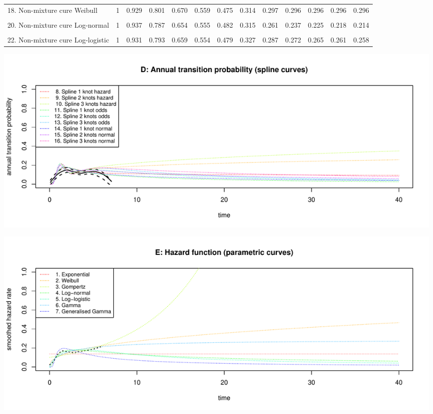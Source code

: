 \documentclass[]{article}
\begin{document}
\begin{table}
{\begin{tabular}[t]{lrrrrrrrrrrrr}
18. Non-mixture cure Weibull & 1 & 0.929 & 0.801 & 0.670 & 0.559 & 0.475 & 0.314 & 0.297 & 0.296 & 0.296 & 0.296 & 0.296\\
\cellcolor{gray!6}{19. Mixture cure Log-normal} & \cellcolor{gray!6}{1} & \cellcolor{gray!6}{0.936} & \cellcolor{gray!6}{0.790} & \cellcolor{gray!6}{0.658} & \cellcolor{gray!6}{0.556} & \cellcolor{gray!6}{0.479} & \cellcolor{gray!6}{0.295} & \cellcolor{gray!6}{0.238} & \cellcolor{gray!6}{0.215} & \cellcolor{gray!6}{0.205} & \cellcolor{gray!6}{0.200} & \cellcolor{gray!6}{0.197}\\
20. Non-mixture cure Log-normal & 1 & 0.937 & 0.787 & 0.654 & 0.555 & 0.482 & 0.315 & 0.261 & 0.237 & 0.225 & 0.218 & 0.214\\
\cellcolor{gray!6}{21. Mixture cure Log-logistic} & \cellcolor{gray!6}{1} & \cellcolor{gray!6}{0.931} & \cellcolor{gray!6}{0.793} & \cellcolor{gray!6}{0.658} & \cellcolor{gray!6}{0.553} & \cellcolor{gray!6}{0.477} & \cellcolor{gray!6}{0.318} & \cellcolor{gray!6}{0.275} & \cellcolor{gray!6}{0.259} & \cellcolor{gray!6}{0.250} & \cellcolor{gray!6}{0.246} & \cellcolor{gray!6}{0.243}\\
22. Non-mixture cure Log-logistic & 1 & 0.931 & 0.793 & 0.659 & 0.554 & 0.479 & 0.327 & 0.287 & 0.272 & 0.265 & 0.261 & 0.258\\
\bottomrule
\end{tabular}}
\end{table}

\begin{flushleft}\includegraphics[height=0.29\textheight]{Images/validate_extrapolation2-4} \end{flushleft}

\begin{flushleft}\includegraphics[height=0.29\textheight]{Images/validate_extrapolation2-5} \end{flushleft}
\end{document}
